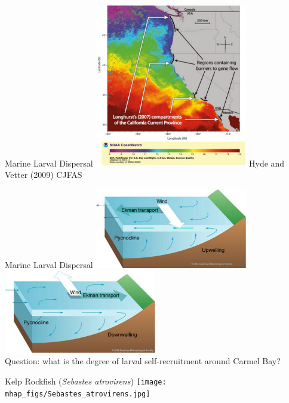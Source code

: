 \documentclass[letter,graphicx]{beamer}
\begin{document}
\begin{frame}{Marine Larval Dispersal}
\includegraphics[width=0.5\textwidth]{mhap_figs/vetter_coast.png}
Hyde and Vetter (2009) CJFAS
\end{frame}




\begin{frame}{Marine Larval Dispersal}
\includegraphics[width=0.5\textwidth]{mhap_figs/ekman-upwelling.jpg}\\
\includegraphics[width=0.5\textwidth]{mhap_figs/ekman-downwelling.jpg}\\
Question: what is the degree of larval self-recruitment around Carmel Bay?
\end{frame}




\begin{frame}{Kelp Rockfish ({\em Sebastes atrovirens})}
\texttt{[image: mhap\_figs/Sebastes\_atrovirens.jpg]}
\end{frame}
\end{document}
